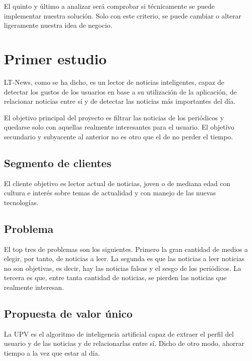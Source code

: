 El quinto y último a analizar será comprobar si técnicamente se puede implementar nuestra solución. Solo con este criterio, se puede cambiar o alterar ligeramente nuestra idea de negocio.

\section{Primer estudio}\label{sec:primer_estudio}

LT-News, como se ha dicho, es un lector de noticias inteligentes, capaz de detectar los gustos de los usuarios en base a su utilización de la aplicación, de relacionar noticias entre sí y de detectar las noticias más importantes del día.

El objetivo principal del proyecto es filtrar las noticias de los periódicos y quedarse solo con aquellas realmente interesantes para el usuario. El objetivo secundario y subyacente al anterior no es otro que el de no perder el tiempo.


\subsection{Segmento de clientes}
El cliente objetivo es lector actual de noticias, joven o de mediana edad con cultura e interés sobre temas de actualidad y con manejo de las nuevas tecnologías. 

\subsection{Problema}
El top tres de problemas son los siguientes. Primero la gran cantidad de medios a elegir, por tanto, de noticias a leer. La segunda es que las noticias a leer noticias no son objetivas, es decir, hay las noticias falsas y el sesgo de los periódicos. La tercera es que, entre tanta cantidad de noticias, se pierden las noticias que realmente interesan.

\subsection{Propuesta de valor único}
La UPV es el algoritmo de inteligencia artificial capaz de extraer el perfil del usuario y de las noticias y de relacionarlas entre sí. Dicho de otro modo, ahorrar tiempo a la vez que estar al día.

